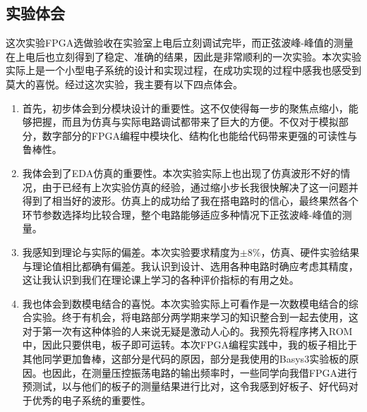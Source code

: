 \documentclass[12pt,a4paper]{article}
\begin{document}
\begin{spacing}{1.3}
\section{实验体会}
这次实验FPGA选做验收在实验室上电后立刻调试完毕，而正弦波峰-峰值的测量在上电后也立刻得到了稳定、准确的结果，因此是非常顺利的一次实验。本次实验实际上是一个小型电子系统的设计和实现过程，在成功实现的过程中感我也感受到莫大的喜悦。经过这次实验，我主要有以下四点体会。
\begin{enumerate}
\item 首先，初步体会到分模块设计的重要性。这不仅使得每一步的聚焦点缩小，能够把握，而且为仿真与实际电路调试都带来了巨大的方便。不仅对于模拟部分，数字部分的FPGA编程中模块化、结构化也能给代码带来更强的可读性与鲁棒性。
\item 我体会到了EDA仿真的重要性。本次实验实际上也出现了仿真波形不好的情况，由于已经有上次实验仿真的经验，通过缩小步长我很快解决了这一问题并得到了相当好的波形。仿真上的成功给了我在搭电路时的信心，最终果然各个环节参数选择均比较合理，整个电路能够适应多种情况下正弦波峰-峰值的测量。
\item 我感知到理论与实际的偏差。本次实验要求精度为$\pm 8\%$，仿真、硬件实验结果与理论值相比都确有偏差。我认识到设计、选用各种电路时确应考虑其精度，这让我认识到我们在理论课上学习的各种评价指标的有用之处。
\item 我也体会到数模电结合的喜悦。本次实验实际上可看作是一次数模电结合的综合实验。终于有机会，将电路部分两学期来学习的知识整合到一起去使用，这对于第一次有这种体验的人来说无疑是激动人心的。我预先将程序拷入ROM中，因此只要供电，板子即可运转。本次FPGA编程实践中，我的板子相比于其他同学更加鲁棒，这部分是代码的原因，部分是我使用的Basys3实验板的原因。也因此，在测量压控振荡电路的输出频率时，一些同学向我借FPGA进行预测试，以与他们的板子的测量结果进行比对，这令我感到好板子、好代码对于优秀的电子系统的重要性。
\end{enumerate}
\end{spacing}
\end{document}
